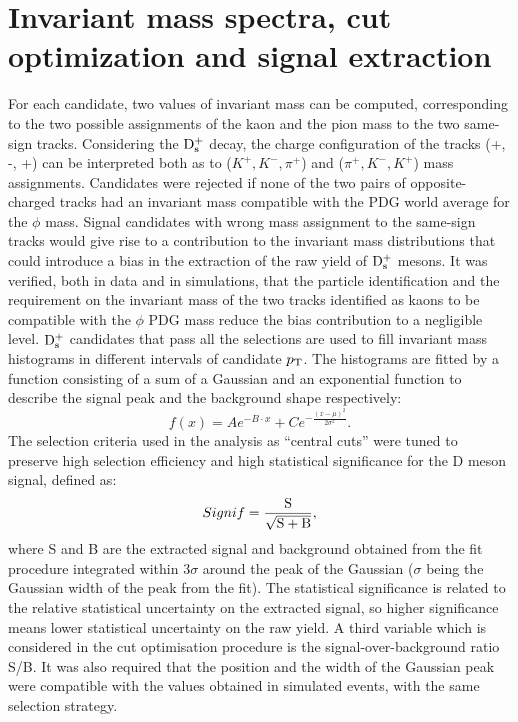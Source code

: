 \section{Invariant mass spectra, cut optimization and signal extraction}
\label{sec:invMassPlotsPP}
For each candidate, two values of invariant mass can be computed, 
corresponding to the two possible assignments of the kaon and the 
pion mass to the two same-sign tracks. Considering the ${\rm D_s^+}$
 decay, the charge configuration of the tracks (+, -, +) can be interpreted
  both as to ($K^+,K^-,\pi^+$) and ($\pi^+,K^-,K^+$) mass assignments. 
     Candidates were rejected if none of the two pairs of opposite-charged 
   tracks had an invariant mass compatible with the PDG world average for the $\phi$ mass.
Signal candidates with 
  wrong mass assignment to the same-sign tracks would give rise to 
  a contribution to the invariant mass distributions that could introduce
   a bias in the extraction of the raw yield of ${\rm D_s^+}$ mesons.
   It was verified, both in data and in simulations, that the particle identification and the requirement 
   on the invariant mass of the two tracks identified as kaons to be compatible with the
$\phi$ PDG mass reduce the bias contribution to a negligible level.
${\rm D_s^+}$ candidates that pass all the selections are 
used to fill invariant mass histograms in different intervals of candidate $p_{\rm T}$.
The histograms are fitted by a function consisting of a sum of 
a Gaussian and an exponential function to describe the signal peak and 
the background shape respectively:
\begin{equation}
f(x)= Ae^{-B\cdot x}+Ce^{-\frac{(x-\mu)^2}{2\sigma^2}}.
\end{equation}
The selection criteria used in the analysis as  ``central cuts'' were tuned to 
preserve high selection efficiency and high statistical 
 significance for the D meson signal, defined as:
\[
Signif = \frac{\rm S}{\sqrt{\rm S+B}},
\]
where S and B are the extracted signal and background obtained 
from the fit procedure integrated within 3$\sigma$ 
around the peak of the Gaussian ($\sigma$ being the
Gaussian width of the peak from the fit). The statistical significance is related to the 
relative statistical uncertainty on the extracted signal, so higher 
significance means lower statistical uncertainty on the raw yield. 
A third variable which is considered in the cut optimisation procedure
 is the signal-over-background ratio S/B. It was also
required that the position and the width 
  of the Gaussian peak were compatible with the values
   obtained in simulated events, with the same selection strategy.
